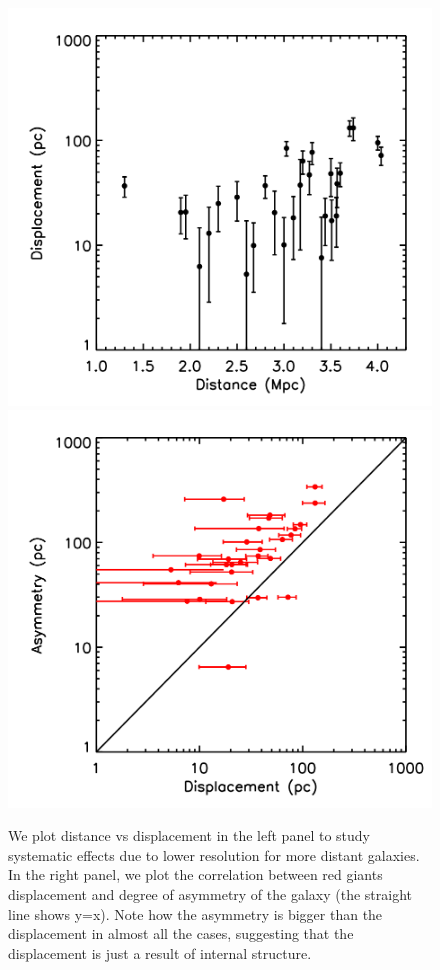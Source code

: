 \documentclass{emulateapj}
\begin{document}
\begin{figure}
\begin{center}
\includegraphics[scale=0.2]{figures/dispdist.png}
\includegraphics[scale=0.2]{figures/dispdispcm.png}
  \caption{We plot distance vs displacement in the left panel to study systematic
effects due to lower resolution for more distant galaxies.
In the right panel, we plot the
correlation between red giants displacement and degree of asymmetry of the
galaxy (the straight line shows y=x). Note how the asymmetry is bigger than
the displacement in almost all the cases, 
suggesting that the displacement is just a result of internal structure.}
\label{fig:rgsyst}
\end{center}
\end{figure}
\end{document}
